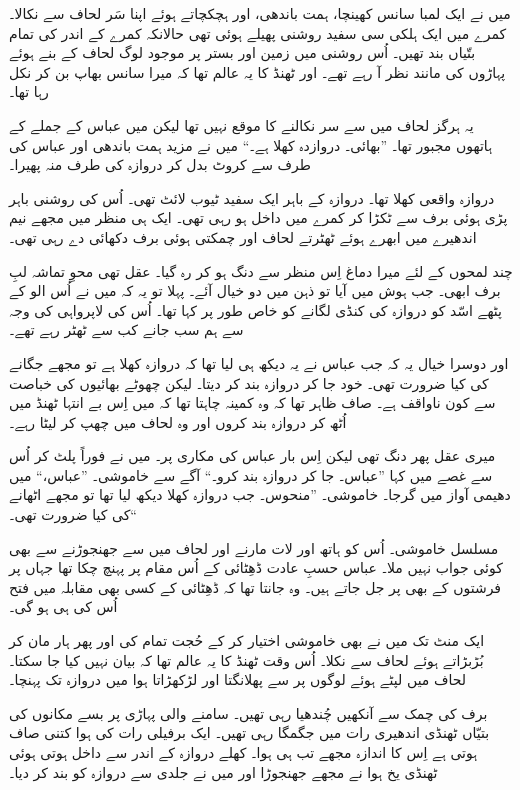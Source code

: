 \documentclass{article}
\begin{document}
میں نے ایک لمبا سانس کھینچا، ہمت باندھی، اور ہچکچاتے ہوئے اپنا سَر لحاف سے نکالا۔ کمرے میں ایک ہلکی سی سفید روشنی پھیلے ہوئی تھی حالانکہ کمرے کے اندر کی تمام بتّیاں بند تھیں۔ اُس روشنی میں زمین اور بستر پر موجود لوگ لحاف کے بنے ہوئے پہاڑوں کی مانند نظر آ رہے تھے۔ اور ٹھنڈ کا یہ عالم تھا کہ میرا سانس بھاپ بن کر نکل رہا تھا۔

یہ ہرگز لحاف میں سے سر نکالنے کا موقع نہیں تھا لیکن میں عباس کے جملے کے ہاتھوں مجبور تھا۔ ''بھائی۔ دروازدہ کھلا ہے۔`` میں نے مزید ہمت باندھی اور عباس کی طرف سے کروٹ بدل کر دروازہ کی طرف منہ پھیرا۔

دروازہ واقعی کھلا تھا۔ دروازہ کے باہر ایک سفید ٹیوب لائٹ تھی۔ اُس کی روشنی باہر پڑی ہوئی برف سے ٹکڑا کر کمرے میں داخل ہو رہی تھی۔ ایک ہی منظر میں مجھے نیم اندھیرے میں ابھرے ہوئے ٹھٹرتے لحاف اور چمکتی ہوئی برف دکھائی دے رہی تھی۔

چند لمحوں کے لئے میرا دماغ اِس منظر سے دنگ ہو کر رہ گیا۔ عقل تھی محوِ تماشہ لبِ برف ابھی۔ جب ہوش میں آیا تو ذہن میں دو خیال آئے۔ پہلا تو یہ کہ میں نے اُس الو کے پٹھے اسّد کو دروازہ کی کنڈی لگانے کو خاص طور پر کہا تھا۔ اُس کی لاپرواہی کی وجہ سے ہم سب جانے کب سے ٹھٹر رہے تھے۔

اور دوسرا خیال یہ کہ جب عباس نے یہ دیکھ ہی لیا تھا کہ دروازہ کھلا ہے تو مجھے جگانے کی کیا ضرورت تھی۔ خود جا کر دروازہ بند کر دیتا۔ لیکن چھوٹے بھائیوں کی خباصت سے کون ناواقف ہے۔ صاف ظاہر تھا کہ وہ کمینہ چاہتا تھا کہ میں اِس بے انتہا ٹھنڈ میں اُٹھ کر دروازہ بند کروں اور وہ لحاف میں چھپ کر لیٹا رہے۔

میری عقل پھر دنگ تھی لیکن اِس بار عباس کی مکاری پر۔ میں نے فوراً پلٹ کر اُس سے غصے میں کہا ''عباس۔ جا کر دروازہ بند کرو۔`` آگے سے خاموشی۔ ''عباس،`` میں دھیمی آواز میں گرجا۔ خاموشی۔ ''منحوس۔ جب دروازہ کھلا دیکھ لیا تھا تو مجھے اٹھانے کی کیا ضرورت تھی۔``

مسلسل خاموشی۔ اُس کو ہاتھ اور لات مارنے اور لحاف میں سے جھنجوڑنے سے بھی کوئی جواب نہیں ملا۔ عباس حسبِ عادت ڈھِٹائی کے اُس مقام پر پہنچ چکا تھا جہاں پر فرشتوں کے بھی پر جل جاتے ہیں۔ وہ جانتا تھا کہ ڈھِٹائی کے کسی بھی مقابلہ میں فتح اُس کی ہی ہو گی۔

ایک منٹ تک میں نے بھی خاموشی اختیار کر کے حُجت تمام کی اور پھر ہار مان کر بُڑبڑاتے ہوئے لحاف سے نکلا۔ اُس وقت ٹھنڈ کا یہ عالم تھا کہ بیان نہیں کیا جا سکتا۔ لحاف میں لپٹے ہوئے لوگوں پر سے پھلانگتا اور لڑکھڑاتا ہوا میں دروازہ تک پہنچا۔

برف کی چمک سے آنکھیں چُندھیا رہی تھیں۔ سامنے والی پہاڑی پر بسے مکانوں کی بتیّاں ٹھنڈی اندھیری رات میں جگمگا رہی تھیں۔ ایک برفیلی رات کی ہوا کتنی صاف ہوتی ہے اِس کا اندازہ مجھے تب ہی ہوا۔ کھلے دروازہ کے اندر سے داخل ہوتی ہوئی ٹھنڈی یخ ہوا نے مجھے جھنجوڑا اور میں نے جلدی سے دروازہ کو بند کر دیا۔
\end{document}
